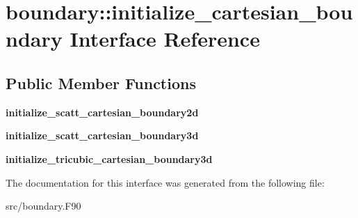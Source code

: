 \hypertarget{interfaceboundary_1_1initialize__cartesian__boundary}{}\section{boundary\+:\+:initialize\+\_\+cartesian\+\_\+boundary Interface Reference}
\label{interfaceboundary_1_1initialize__cartesian__boundary}
\subsection*{Public Member Functions}
\begin{DoxyCompactItemize}
\item 
\mbox{\label{interfaceboundary_1_1initialize__cartesian__boundary_a8e0377a001387835c58dab9420d10376}} 
{\bfseries initialize\+\_\+scatt\+\_\+cartesian\+\_\+boundary2d}
\item 
\mbox{\label{interfaceboundary_1_1initialize__cartesian__boundary_a8e0319c7164f152181a12183bd041e66}} 
{\bfseries initialize\+\_\+scatt\+\_\+cartesian\+\_\+boundary3d}
\item 
\mbox{\label{interfaceboundary_1_1initialize__cartesian__boundary_a8e78b2f5122eb6432ab453e77f4740d4}} 
{\bfseries initialize\+\_\+tricubic\+\_\+cartesian\+\_\+boundary3d}
\end{DoxyCompactItemize}


The documentation for this interface was generated from the following file\+:\begin{DoxyCompactItemize}
\item 
src/boundary.\+F90\end{DoxyCompactItemize}

